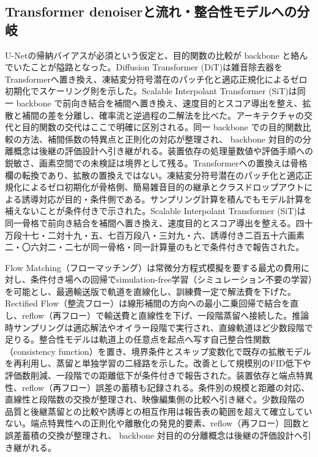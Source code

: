 \documentclass[lualatex,a4paper,10pt]{jlreq}
\begin{document}
\subsection{Transformer denoiserと流れ・整合性モデルへの分岐}
U-Netの帰納バイアスが必須という仮定と、目的関数の比較が backbone と絡んでいたことが隘路となった。Diffusion Transformer (DiT)は雑音除去器をTransformerへ置き換え、凍結変分符号潜在のパッチ化と適応正規化によるゼロ初期化でスケーリング則を示した\autocite{btd025}。Scalable Interpolant Transformer (SiT)は同一 backbone で前向き結合を補間へ置き換え、速度目的とスコア導出を整え、拡散と補間の差を分離し、確率流と逆過程の二解法を比べた\autocite{btd026}。アーキテクチャの交代と目的関数の交代はここで明確に区別される。同一 backbone での目的関数比較の方法、補間係数の特異点と正則化の対応が整理され、 backbone 対目的の分離概念は後継の評価設計へ引き継がれる\autocite{btd026}。装置依存の処理量数値や評価手順への鋭敏さ、画素空間での未検証は境界として残る\autocite{btd025}。Transformerへの置換えは骨格欄の転換であり、拡散の置換えではない\autocite{btd025}。凍結変分符号潜在のパッチ化と適応正規化によるゼロ初期化が骨格側、簡易雑音目的の継承とクラスドロップアウトによる誘導対応が目的・条件側である\autocite{btd025}。サンプリング計算を積んでもモデル計算を補えないことが条件付きで示された\autocite{btd025}。Scalable Interpolant Transformer (SiT)は同一骨格で前向き結合を補間へ置き換え、速度目的とスコア導出を整える\autocite{btd026}。四十万段十七・二対十九・五、七百万段八・三対九・六、誘導付き二百五十六画素二・〇六対二・二七が同一骨格・同一計算量のもとで条件付きで報告された\autocite{btd026}。

Flow Matching（フローマッチング）は常微分方程式模擬を要する最尤の費用に対し、条件付き場への回帰でsimulation-free学習（シミュレーション不要の学習）を可能とし、最適輸送版で軌道を直線化し、訓練費一定で解法費を下げた\autocite{btd027}。Rectified Flow（整流フロー）は線形補間の方向への最小二乗回帰で結合を直し、reflow（再フロー）で輸送費と直線性を下げ、一段階蒸留へ接続した\autocite{btd028}。推論時サンプリングは適応解法やオイラー段階で実行され、直線軌道ほど少数段階で足りる\autocite{btd027,btd028}。整合性モデルは軌道上の任意点を起点へ写す自己整合性関数（consistency function）を置き、境界条件とスキップ変数化で既存の拡散モデルを再利用し、蒸留と単独学習の二経路を示した\autocite{btd029}。改善として規模別のFID低下や評価数削減、一段階での距離低下が条件付きで報告された\autocite{btd025,btd027,btd029}。装置依存と端点特異性、reflow（再フロー）誤差の蓄積も記録される\autocite{btd027,btd028}。条件別の規模と距離の対応、直線性と段階数の交換が整理され、映像編集側の比較へ引き継ぐ。少数段階の品質と後継蒸留との比較や誘導との相互作用は報告表の範囲を超えて確立していない\autocite{btd029}。端点特異性への正則化や離散化の発見的要素、reflow（再フロー）回数と誤差蓄積の交換が整理され、 backbone 対目的の分離概念は後継の評価設計へ引き継がれる\autocite{btd026,btd027,btd028}。
\end{document}
